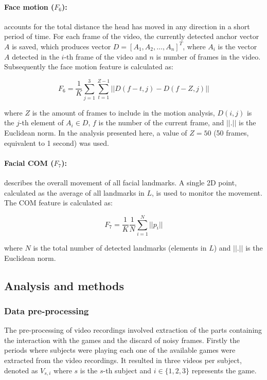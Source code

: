\paragraph{Face motion ($F_6$):} accounts for the total distance the head has moved in any direction in a short period of time. For each frame of the video, the currently detected anchor vector $A$ is saved, which produces vector $D = [A_1, A_2, \dots, A_n]^T$, where $A_i$ is the vector $A$ detected in the $i$-th frame of the video and $n$ is number of frames in the video. Subsequently the face motion feature is calculated as:

\[
F_6 = \frac{1}{K} \sum_{j=1}^{3} \sum_{t=1}^{Z - 1} || D(f - t, j) - D(f - Z, j) ||
\]

where $Z$ is the amount of frames to include in the motion analysis, $D(i,j)$ is the $j$-th element of $A_i \in D$, $f$ is the number of the current frame, and $||.||$ is the Euclidean norm. In the analysis presented here, a value of $Z=50$ (50 frames, equivalent to 1 second) was used.

\paragraph{Facial COM ($F_7$):} describes the overall movement of all facial landmarks. A single 2D point, calculated as the average of all landmarks in $L$, is used to monitor the movement. The COM feature is calculated as:

\[
F_7 = \frac{1}{K} \frac{1}{N} \sum_{i=1}^{N} || p_i ||
\]

where $N$ is the total number of detected landmarks (elements in $L$) and $||.||$ is the Euclidean norm.

\subsection{Analysis and methods}
\label{s:experiment1-study4-feature-analysis}

\subsubsection{Data pre-processing}

The pre-processing of video recordings involved extraction of the parts containing the interaction with the games and the discard of noisy frames. Firstly the periods where subjects were playing each one of the available games were extracted from the video recordings. It resulted in three videos per subject, denoted as $V_{s,i}$ where $s$ is the $s$-th subject and $i \in \{1, 2, 3\}$ represents the game.

